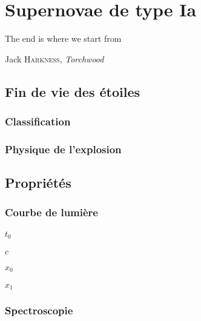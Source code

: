 \documentclass[../main/main.tex]{subfiles}
\begin{document}
\chapter{Supernovae de type Ia}\label{ch:sne}

\epigraph{The end is where we start from}{Jack \textsc{Harkness},
\textit{Torchwood}}

\minitoc
\newpage

\section{Fin de vie des étoiles}\label{sec:death}

\subsection{Classification}\label{ssec:class}

\subsection{Physique de l'explosion}\label{ssec:explo}

\section{Propriétés}\label{sec:sneprop}

\subsection{Courbe de lumière}\label{ssec:lc}
\subsubsection*{$t_0$}
\subsubsection*{$c$}
\subsubsection*{$x_0$}
\subsubsection*{$x_1$}

\subsection{Spectroscopie}\label{ssec:spectro}
\end{document}
